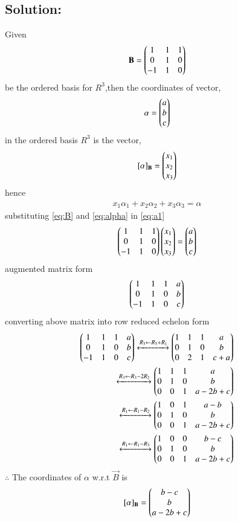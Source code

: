 \documentclass[journal,12pt,twocolumn]{IEEEtran}
\begin{document}
\subsection*{Solution:}
Given
\begin{align}
\mathbf{B} = \begin{pmatrix}1&1&1\\0&1&0\\-1&1&0\end{pmatrix}\label{eq:B}
\end{align}
be the ordered basis for $R^3$,then the coordinates of vector,
\begin{align}
\mathbf{\alpha} = \begin{pmatrix}a\\b\\c\end{pmatrix}\label{eq:alpha}
\end{align}
in the ordered basis $R^3$ is the vector,
\begin{align}
\mathbf{[\alpha]_B} = \begin{pmatrix}x_1\\x_2\\x_3\end{pmatrix}\label{eq:x}
\end{align}
hence
\begin{align}
x_1\alpha_1+x_2\alpha_2+x_3\alpha_3 = \alpha\label{eq:a1}
\end{align}
substituting \eqref{eq:B} and \eqref{eq:alpha} in \eqref{eq:a1}
\begin{align}
\begin{pmatrix}1&1&1\\0&1&0\\-1&1&0\end{pmatrix}\begin{pmatrix}x_1\\x_2\\x_3\end{pmatrix} = \begin{pmatrix}a\\b\\c\end{pmatrix}
\end{align}
augmented matrix form
\begin{align}
\begin{pmatrix}1&1&1&a\\0&1&0&b\\-1&1&0&c\end{pmatrix}
\end{align}
converting above matrix into row reduced echelon form
\begin{align}
\begin{pmatrix}1&1&1&a\\0&1&0&b\\-1&1&0&c\end{pmatrix}\xleftrightarrow[]{R_3\leftarrow R_3+R_1}\begin{pmatrix}1&1&1&a\\0&1&0&b\\0&2&1&c+a\end{pmatrix}\\
\xleftrightarrow[]{R_3\leftarrow R_3-2R_2}\begin{pmatrix}1&1&1&a\\0&1&0&b\\0&0&1&a-2b+c\end{pmatrix}\\
\xleftrightarrow[]{R_1\leftarrow R_1-R_2}\begin{pmatrix}1&0&1&a-b\\0&1&0&b\\0&0&1&a-2b+c\end{pmatrix}\\
\xleftrightarrow[]{R_1\leftarrow R_1-R_3}\begin{pmatrix}1&0&0&b-c\\0&1&0&b\\0&0&1&a-2b+c\end{pmatrix}
\end{align}
$\therefore$ The coordinates of $\alpha$ w.r.t $\vec{B}$ is
\begin{align}
\mathbf{[\alpha]_B} = \begin{pmatrix}b-c\\b\\a-2b+c\end{pmatrix}
\end{align}
\end{document}
